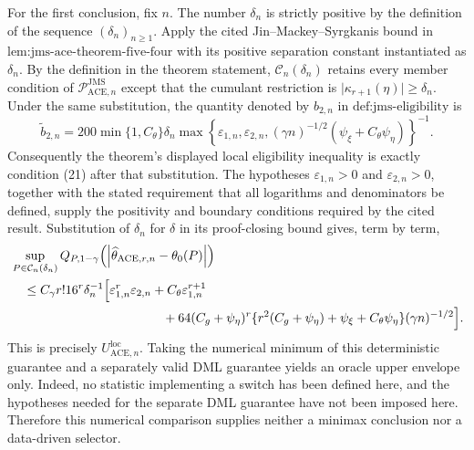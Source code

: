 For the first conclusion, fix \(n\).  The number \(\delta_n\) is strictly positive by the definition of the sequence \((\delta_n)_{n\geq 1}\).  Apply the cited Jin--Mackey--Syrgkanis bound in \(\text{lem:jms-ace-theorem-five-four}\) with its positive separation constant instantiated as \(\delta_n\).  By the definition in the theorem statement, \(\mathcal C_n(\delta_n)\) retains every member condition of \(\mathcal P_{\mathrm{ACE},n}^{\mathrm{JMS}}\) except that the cumulant restriction is \(\lvert\kappa_{r+1}(\eta)\rvert\geq\delta_n\).  Under the same substitution, the quantity denoted by \(b_{2,n}\) in \(\text{def:jms-eligibility}\) is
\[
 \widetilde b_{2,n}
 =200\min\{1,C_\theta\}\delta_n
 \max\!\left\{
   \varepsilon_{1,n},\varepsilon_{2,n},
   (\gamma n)^{-1/2}(\psi_\xi+C_\theta\psi_\eta)
 \right\}^{-1}.
\]
Consequently the theorem's displayed local eligibility inequality is exactly condition (21) after that substitution.  The hypotheses \(\varepsilon_{1,n}>0\) and \(\varepsilon_{2,n}>0\), together with the stated requirement that all logarithms and denominators be defined, supply the positivity and boundary conditions required by the cited result.  Substitution of \(\delta_n\) for \(\delta\) in its proof-closing bound gives, term by term,
\[
\begin{aligned}
 &\sup_{P\in\mathcal C_n(\delta_n)}
 Q_{P,1-\gamma}
 \!\left(\left|\widehat\theta_{\mathrm{ACE},r,n}-\theta_0(P)\right|\right)\\
 &\quad\leq
 C_\gamma r!16^r\delta_n^{-1}
 \Bigl[
   \varepsilon_{1,n}^r\varepsilon_{2,n}
   +C_\theta\varepsilon_{1,n}^{r+1}\\
 &\hspace{42mm}
   +64(C_g+\psi_\eta)^r
    \{r^2(C_g+\psi_\eta)+\psi_\xi+C_\theta\psi_\eta\}
    (\gamma n)^{-1/2}
 \Bigr].
\end{aligned}
\]
This is precisely \(U_{\mathrm{ACE},n}^{\mathrm{loc}}\).  Taking the numerical minimum of this deterministic guarantee and a separately valid DML guarantee yields an oracle upper envelope only.  Indeed, no statistic implementing a switch has been defined here, and the hypotheses needed for the separate DML guarantee have not been imposed here.  Therefore this numerical comparison supplies neither a minimax conclusion nor a data-driven selector.


